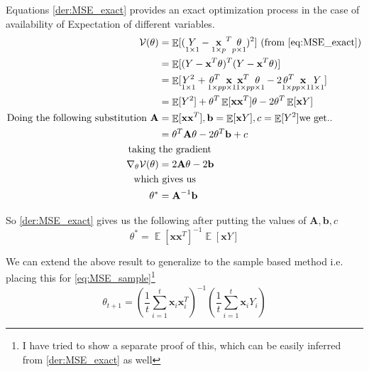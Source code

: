 \documentclass[twoside]{article}
\DeclareMathOperator{\E}{\mathbb{E}}
\begin{document}
Equations \ref{der:MSE_exact} provides an exact optimization process in the case of availability of Expectation of different variables.
\begin{equation}\label{der:MSE_exact}
    \begin{split}
        \mathcal{V}(\theta) &= \E[(\underset{1 \times 1}{Y} - \underset{1 \times p}{\textbf{x}}^T\underset{p \times 1}{\theta})^2] \text{  (from \ref{eq:MSE_exact})}\\
        &= \E[(Y - \textbf{x}^T\theta)^T(Y - \textbf{x}^T\theta)]\\
        &= \E[ \underset{1 \times 1}{Y^2} + \underset{1 \times p}{\theta^T}\underset{p \times 1}{\textbf{x}}\underset{1 \times p}{\textbf{x}^T}\underset{p \times 1}{\theta} - 2\underset{1 \times p}{\theta^T}\underset{p \times 1}{\textbf{x}}\underset{1 \times 1}{Y}]\\
        &= \E[Y^2] + \theta^T\E[\textbf{x}\textbf{x}^T]\theta - 2\theta^T\E[\textbf{x}Y]\\
        \text{Doing the following substitution } \textbf{A} &= \E[\textbf{x}\textbf{x}^T], \textbf{b} = \E[\textbf{x}Y], c = \E[Y^2] \text{we get..}\\
        &= \theta^T\textbf{A}\theta - 2\theta^T\textbf{b} + c\\
        \text{taking } & \text{the gradient}\\
        \nabla_\theta\mathcal{V}(\theta) &= 2 \textbf{A} \theta - 2 \textbf{b}\\
        \text{which}&\text{ gives us }\\
        \theta^* &= \textbf{A}^{-1}\textbf{b} 
    \end{split}
\end{equation}

So \ref{der:MSE_exact} gives us the following after putting the values of $\textbf{A}, \textbf{b}, c$
\begin{equation}
    \theta^* = \E[\textbf{x}\textbf{x}^T]^{-1}\E[\textbf{x}Y]
\end{equation}

We can extend the above result to generalize to the sample based method i.e. placing this for \ref{eq:MSE_sample}\footnote{I have tried to show a separate proof of this, which can be easily inferred from \ref{der:MSE_exact} as well}
\begin{equation}\label{eq:MSE_exact_solution}
     \theta_{t+1} = (\dfrac{1}{t}\sum_{i=1}^{t}\textbf{x}_i\textbf{x}_i^T)^{-1}(\dfrac{1}{t}\sum_{i=1}^{t}\textbf{x}_i Y_i)
\end{equation}
\end{document}
